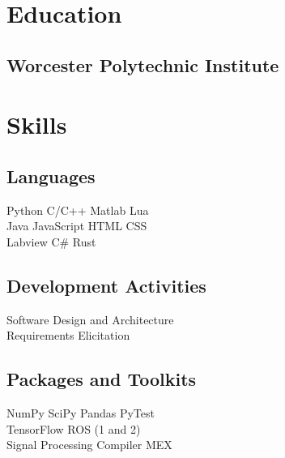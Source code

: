 \documentclass[letterpaper]{deedy-resume} %
\begin{document}
\begin{minipage}[t]{0.33\textwidth} %


\section{Education} 

\subsection{Worcester Polytechnic Institute \hfill}



%
 \section{Skills}
 
 \subsection{Languages}
 
 Python \textbullet{} C/C++ \textbullet{} Matlab \textbullet{} Lua \\ 
 Java \textbullet{} JavaScript \textbullet{} HTML \textbullet{} CSS \\
 Labview \textbullet{} C\# \textbullet{} Rust
 
 \subsection{Development Activities}
 Software Design and Architecture \\
 Requirements Elicitation
 
 \subsection{Packages and Toolkits}
 NumPy \textbullet{} SciPy \textbullet{} Pandas \textbullet{} PyTest \\
TensorFlow \textbullet{} ROS (1 and 2) \\

 Signal Processing \textbullet{} Compiler \textbullet{} MEX


\end{minipage}
\end{document}
